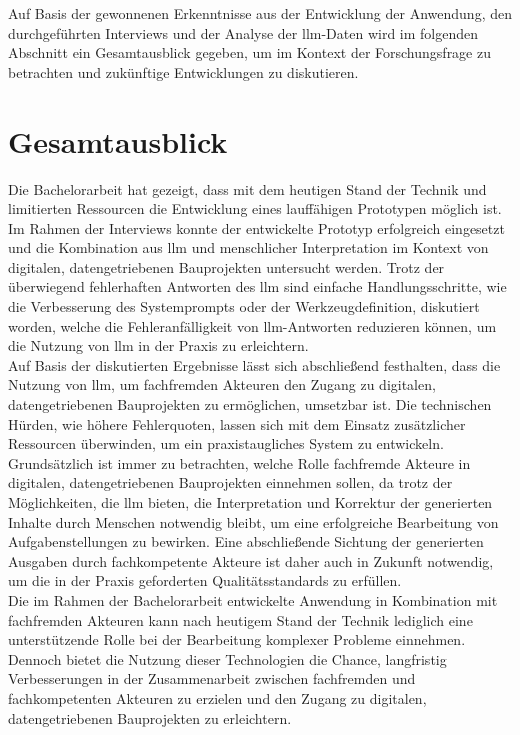 Auf Basis der gewonnenen Erkenntnisse aus der Entwicklung der Anwendung, den durchgeführten Interviews und der Analyse der \gls{llm}-Daten wird im folgenden Abschnitt
ein Gesamtausblick gegeben, um im Kontext der Forschungsfrage zu betrachten und zukünftige Entwicklungen zu diskutieren.

\section{Gesamtausblick}

Die Bachelorarbeit hat gezeigt, dass mit dem heutigen Stand der Technik und limitierten Ressourcen die Entwicklung eines lauffähigen Prototypen möglich ist.
Im Rahmen der Interviews konnte der entwickelte Prototyp erfolgreich eingesetzt und die Kombination aus \gls{llm} und menschlicher Interpretation im Kontext von digitalen, datengetriebenen Bauprojekten untersucht werden.
Trotz der überwiegend fehlerhaften Antworten des \gls{llm} sind einfache Handlungsschritte, wie die Verbesserung des Systemprompts oder der Werkzeugdefinition, diskutiert worden, 
welche die Fehleranfälligkeit von \gls{llm}-Antworten reduzieren können, um die Nutzung von \gls{llm} in der Praxis zu erleichtern. \\

Auf Basis der diskutierten Ergebnisse lässt sich abschließend festhalten,
dass die Nutzung von \gls{llm}, um fachfremden Akteuren den Zugang zu digitalen, datengetriebenen Bauprojekten zu ermöglichen, umsetzbar ist.
Die technischen Hürden, wie höhere Fehlerquoten, lassen sich mit dem Einsatz zusätzlicher Ressourcen überwinden, um ein praxistaugliches System zu entwickeln. \\

Grundsätzlich ist immer zu betrachten, welche Rolle fachfremde Akteure in digitalen, datengetriebenen Bauprojekten einnehmen sollen,
da trotz der Möglichkeiten, die \gls{llm} bieten, die Interpretation und Korrektur der generierten Inhalte durch Menschen notwendig bleibt, um eine erfolgreiche Bearbeitung von Aufgabenstellungen zu bewirken.
Eine abschließende Sichtung der generierten Ausgaben durch fachkompetente Akteure ist daher auch in Zukunft notwendig, um die in der Praxis geforderten Qualitätsstandards zu erfüllen. \\

Die im Rahmen der Bachelorarbeit entwickelte Anwendung in Kombination mit fachfremden Akteuren kann nach heutigem Stand der Technik lediglich eine unterstützende Rolle bei der Bearbeitung komplexer Probleme einnehmen.
Dennoch bietet die Nutzung dieser Technologien die Chance, langfristig Verbesserungen in der Zusammenarbeit zwischen fachfremden und fachkompetenten Akteuren zu erzielen und den Zugang zu digitalen, datengetriebenen Bauprojekten zu erleichtern.